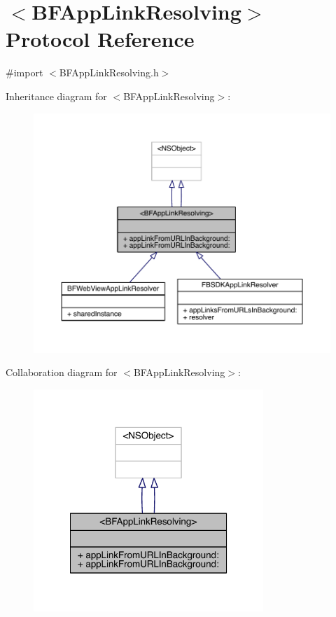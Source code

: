 \hypertarget{protocol_b_f_app_link_resolving-p}{\section{$<$B\-F\-App\-Link\-Resolving$>$ Protocol Reference}
\label{protocol_b_f_app_link_resolving-p}
}


{\ttfamily \#import $<$B\-F\-App\-Link\-Resolving.\-h$>$}



Inheritance diagram for $<$B\-F\-App\-Link\-Resolving$>$\-:
\nopagebreak
\begin{figure}[H]
\begin{center}
\leavevmode
\includegraphics[width=350pt]{protocol_b_f_app_link_resolving-p__inherit__graph}
\end{center}
\end{figure}


Collaboration diagram for $<$B\-F\-App\-Link\-Resolving$>$\-:
\nopagebreak
\begin{figure}[H]
\begin{center}
\leavevmode
\includegraphics[width=246pt]{protocol_b_f_app_link_resolving-p__coll__graph}
\end{center}
\end{figure}
